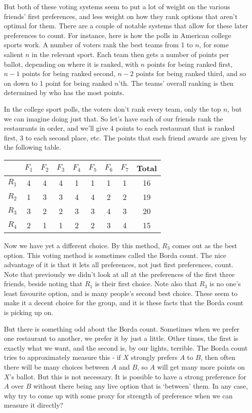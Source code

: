 \begin{multicols}{2}
But both of these voting systems seem to put a lot of weight on the various friends' first preferences, and less weight on how they rank options that aren't optimal for them. There are a couple of notable systems that allow for these later preferences to count. For instance, here is how the polls in American college sports work. A number of voters rank the best teams from 1 to $n$, for some salient $n$ in the relevant sport. Each team then gets a number of points per ballot, depending on where it is ranked, with $n$ points for being ranked first, $n-1$ points for being ranked second, $n-2$ points for being ranked third, and so on down to 1 point for being ranked $n$'th. The teams' overall ranking is then determined by who has the most points.

In the college sport polls, the voters don't rank every team, only the top $n$, but we can imagine doing just that. So let's have each of our friends rank the restaurants in order, and we'll give 4 points to each restaurant that is ranked first, 3 to each second place, etc. The points that each friend awards are given by the following table.

\begin{center}
\begin{tabular}{r | c c c c c c c c}
 & $F_1$ & $F_2$ & $F_3$ & $F_4$ & $F_5$ & $F_6$ & $F_7$ & Total \\ \hline
$R_1$ & 4 & 4 & 4 & 1 & 1 & 1 & 1 & 16 \\
$R_2$ & 1 & 3 & 3 & 4 & 4 & 2 & 2 & 19 \\
$R_3$ & 3 & 2 & 2 & 3 & 3 & 4 & 3 & 20 \\
$R_4$ & 2 & 1 & 1 & 2 & 2 & 3 & 4 & 15
\end{tabular}
\end{center}
Now we have yet a different choice. By this method, $R_3$ comes out as the best option. This voting method is sometimes called the Borda count. The nice advantage of it is that it lets all preferences, not just first preferences, count. Note that previously we didn't look at all at the preferences of the first three friends, beside noting that $R_1$ is their first choice. Note also that $R_3$ is no one's least favourite option, and is many people's second best choice. These seem to make it a decent choice for the group, and it is these facts that the Borda count is picking up on.

But there is something odd about the Borda count. Sometimes when we prefer one restaurant to another, we prefer it by just a little. Other times, the first is exactly what we want, and the second is, by our lights, terrible. The Borda count tries to approximately measure this - if $X$ strongly prefers $A$ to $B$, then often there will be many choices between $A$ and $B$, so $A$ will get many more points on $X$'s ballot. But this is not necessary. It is possible to have a strong preference for $A$ over $B$ without there being any live option that is `between' them.  In any case, why try to come up with some proxy for strength of preference when we can measure it directly?


\end{multicols}
